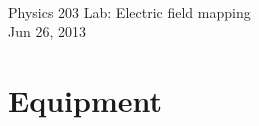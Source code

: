 \documentclass{article}
\begin{document}
\begin{center}
\LARGE{} \\[5mm]
\small{\sf Physics 203 Lab: Electric field mapping} \\[2mm]
\small{\sf Jun 26, 2013}
\end{center}

\section{Equipment}

\begin{itemize}

\end{itemize}
\end{document}
